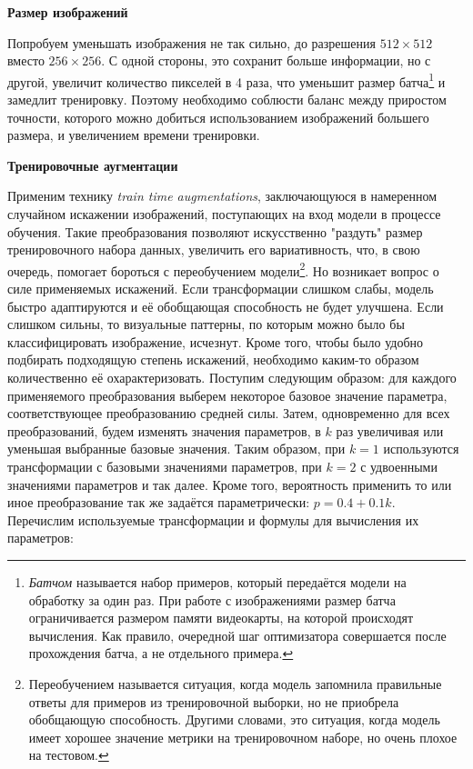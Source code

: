 \indent
\indent
\textbf{Размер изображений}

\indent
Попробуем уменьшать изображения не так сильно, 
до разрешения $512 \times 512$ вместо $256 \times 256 $.
С одной стороны, это сохранит больше информации, но с другой, увеличит 
количество пикселей в 4 раза, что уменьшит размер
батча\footnote{\textit{Батчом} называется набор примеров, который передаётся
модели на обработку за один раз. При работе с изображениями размер батча 
ограничивается размером памяти видеокарты, на которой происходят вычисления.
Как правило, очередной шаг оптимизатора совершается после
прохождения батча, а не отдельного примера.}
и замедлит тренировку.
Поэтому необходимо соблюсти баланс между приростом точности,
которого можно добиться использованием изображений большего размера,
и увеличением времени тренировки.

    
\indent
\indent
\textbf{Тренировочные аугментации}

\indent
Применим технику \textit{train time augmentations}, заключающуюся
в намеренном случайном искажении изображений, поступающих на вход модели 
в процессе обучения. Такие преобразования позволяют искусственно
"раздуть" размер тренировочного набора данных, увеличить его 
вариативность, что, в свою очередь, помогает бороться с переобучением
модели\footnote{Переобучением называется ситуация, когда модель
запомнила правильные ответы для примеров из тренировочной выборки,
но не приобрела обобщающую способность. Другими словами, это ситуация,
когда модель имеет хорошее значение метрики на тренировочном наборе,
но очень плохое на тестовом.}.
Но возникает вопрос о силе применяемых искажений.
Если трансформации слишком слабы, модель быстро адаптируются и её обобщающая 
способность не будет улучшена. Если слишком сильны, то визуальные паттерны, по
которым можно было бы классифицировать изображение, исчезнут. 
Кроме того, чтобы было удобно подбирать подходящую степень искажений,
необходимо каким-то образом количественно её охарактеризовать.
Поступим следующим образом:
для каждого применяемого преобразования выберем некоторое базовое значение 
параметра, соответствующее преобразованию средней силы. 
Затем, одновременно для всех преобразований, будем изменять значения параметров,
в $k$ раз увеличивая или уменьшая выбранные базовые значения.
Таким образом, при $k = 1$ используются трансформации 
с базовыми значениями параметров, при $k = 2$ с удвоенными 
значениями параметров и так далее. Кроме того, вероятность применить то или
иное преобразование так же задаётся параметрически:
$p = 0.4 + 0.1k$.
Перечислим используемые трансформации
и формулы для вычисления их параметров:

